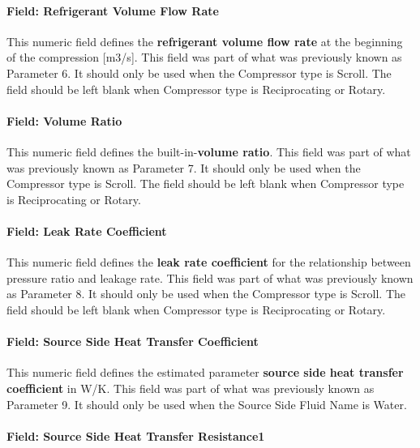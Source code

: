 \paragraph{Field: Refrigerant Volume Flow Rate}\label{field-refrigerant-volume-flow-rate}

This numeric field defines the \textbf{refrigerant volume flow rate} at the beginning of the compression {[}m3/s{]}. This field was part of what was previously known as Parameter 6. It should only be used when the Compressor type is Scroll. The field should be left blank when Compressor type is Reciprocating or Rotary.

\paragraph{Field: Volume Ratio}\label{field-volume-ratio}

This numeric field defines the built-in-\textbf{volume ratio}. This field was part of what was previously known as Parameter 7. It should only be used when the Compressor type is Scroll. The field should be left blank when Compressor type is Reciprocating or Rotary.

\paragraph{Field: Leak Rate Coefficient}\label{field-leak-rate-coefficient}

This numeric field defines the \textbf{leak rate coefficient} for the relationship between pressure ratio and leakage rate. This field was part of what was previously known as Parameter 8. It should only be used when the Compressor type is Scroll. The field should be left blank when Compressor type is Reciprocating or Rotary.

\paragraph{Field: Source Side Heat Transfer Coefficient}\label{field-source-side-heat-transfer-coefficient}

This numeric field defines the estimated parameter \textbf{source side heat transfer coefficient} in W/K. This field was part of what was previously known as Parameter 9. It should only be used when the Source Side Fluid Name is Water.

\paragraph{Field: Source Side Heat Transfer Resistance1}\label{field-source-side-heat-transfer-resistance1}


